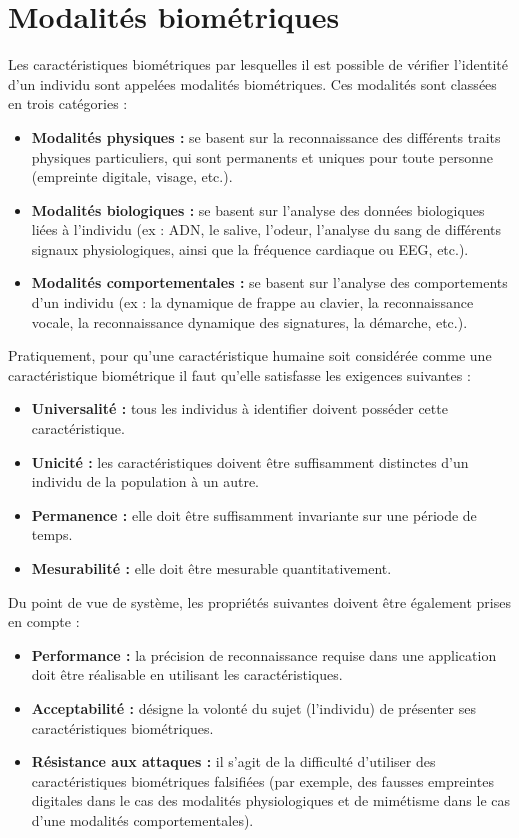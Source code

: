 \section{Modalités biométriques} 
Les caractéristiques biométriques par lesquelles il est possible de vérifier l’identité d’un individu sont appelées modalités biométriques. Ces modalités sont classées en trois catégories :
\begin{itemize}
	\item \textbf{Modalités physiques : }
	se basent sur la reconnaissance des différents traits physiques particuliers, qui sont permanents et uniques pour toute personne (empreinte digitale, visage, etc.).
	\item \textbf{Modalités biologiques : }
	se basent sur l’analyse des données biologiques liées à l’individu (ex : ADN, le salive, l'odeur, l'analyse du sang de différents signaux physiologiques, ainsi que la fréquence cardiaque ou EEG, etc.).
	\item \textbf{Modalités comportementales : }
	se basent sur l’analyse des comportements d’un individu (ex : la dynamique de frappe au clavier, la reconnaissance vocale, la reconnaissance dynamique des signatures, la démarche, etc.).
\end{itemize}
\vspace{1cm} 
Pratiquement, pour qu'une caractéristique humaine soit considérée comme une caractéristique biométrique il faut qu'elle satisfasse les exigences suivantes \citep{Ross} :
\begin{itemize}
	\item \textbf{Universalité : }tous les individus à identifier doivent posséder cette caractéristique.
	\item 
	\textbf{Unicité : }les caractéristiques doivent être suffisamment distinctes d'un individu de la population à un autre.
	\item 
	\textbf{Permanence : }elle doit être suffisamment invariante sur une période de temps.
	\item \textbf{Mesurabilité : }elle doit être mesurable quantitativement.
\end{itemize}
Du point de vue de système, les propriétés suivantes doivent être également prises en compte \citep{Ross} :
\begin{itemize}
	\item \textbf{Performance : }la précision de reconnaissance requise dans une application doit être réalisable en utilisant les caractéristiques.
	\item 
	\textbf{Acceptabilité : }désigne la volonté du sujet (l’individu) de présenter ses caractéristiques biométriques.
	\item 
	\textbf{Résistance aux attaques : }il s'agit de la difficulté d'utiliser des caractéristiques biométriques falsifiées (par exemple, des fausses empreintes digitales dans le cas des modalités physiologiques et de mimétisme dans le cas d'une modalités comportementales).
	
\end{itemize}
